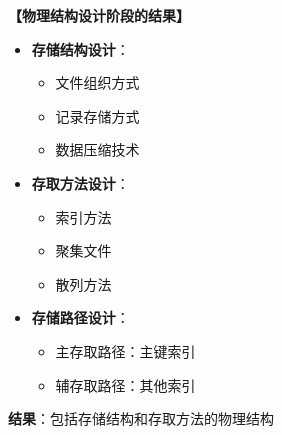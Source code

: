\documentclass[12pt, a4paper]{article}
\newenvironment{bluebox}[1]{%
  \begin{trivlist}
  \item[\hskip\labelsep \textbf{#1}]
  \setlength{\parskip}{0.5ex}
  \setlength{\itemsep}{0.5ex}
}{%
  \end{trivlist}
  }
\begin{document}
\begin{bluebox}{物理设计内容}
	\textbf{【物理结构设计阶段的结果】}

	\begin{itemize}[leftmargin=*, nosep]
		\item \textbf{存储结构设计}：
		      \begin{itemize}[nosep]
			      \item 文件组织方式
			      \item 记录存储方式
			      \item 数据压缩技术
		      \end{itemize}

		\item \textbf{存取方法设计}：
		      \begin{itemize}[nosep]
			      \item 索引方法
			      \item 聚集文件
			      \item 散列方法
		      \end{itemize}

		\item \textbf{存储路径设计}：
		      \begin{itemize}[nosep]
			      \item 主存取路径：主键索引
			      \item 辅存取路径：其他索引
		      \end{itemize}
	\end{itemize}

	\textbf{结果}：包括存储结构和存取方法的物理结构
\end{bluebox}
\end{document}
